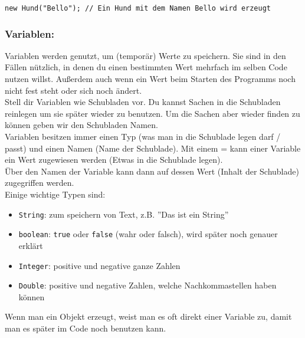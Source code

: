 \begin{lstlisting}[title=\textbf{Objekt erstellen Beispiel}]
	new Hund("Bello"); // Ein Hund mit dem Namen Bello wird erzeugt
\end{lstlisting}
\begin{Infobox}
	\subsubsection*{Variablen:}
	Variablen werden genutzt, um (temporär) Werte zu speichern.
	Sie sind in den Fällen nützlich, in denen du einen bestimmten Wert mehrfach im selben Code nutzen willst.
	Außerdem auch wenn ein Wert beim Starten des Programms noch nicht fest steht oder sich noch ändert.\\

	Stell dir Variablen wie Schubladen vor. Du kannst Sachen in die Schubladen reinlegen um sie später wieder zu benutzen. Um die Sachen aber wieder finden zu können geben wir den Schubladen Namen.\\

	Variablen besitzen immer einen Typ (was man in die Schublade legen darf / passt) und einen Namen (Name der Schublade).
	Mit einem = kann einer Variable ein Wert zugewiesen werden (Etwas in die Schublade legen).\\
	Über den Namen der Variable kann dann auf dessen Wert (Inhalt der Schublade) zugegriffen werden.\\

	Einige wichtige Typen sind:
	\begin{itemize}
		\item \lstinline{String}: zum speichern von Text, z.B. ''Das ist ein String''
		\item \lstinline{boolean}: \lstinline{true} oder \lstinline{false} (wahr oder falsch), wird später noch genauer erklärt
		\item \lstinline{Integer}: positive und negative ganze Zahlen 
		\item \lstinline{Double}: positive und negative Zahlen, welche Nachkommastellen haben können
	\end{itemize}

	Wenn man ein Objekt erzeugt, weist man es oft direkt einer Variable zu, damit man es später im Code noch benutzen kann.
\end{Infobox}

\newpage


